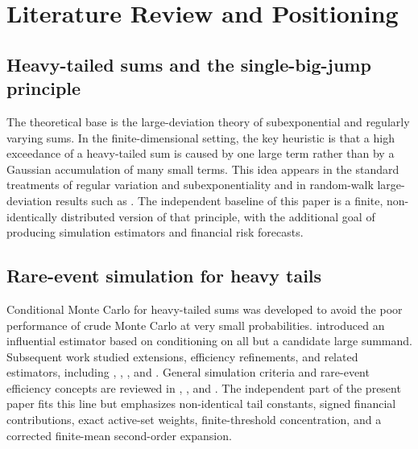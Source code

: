 \section{Literature Review and Positioning}
\label{sec:literature}

\subsection{Heavy-tailed sums and the single-big-jump principle}

The theoretical base is the large-deviation theory of subexponential and
regularly varying sums. In the finite-dimensional setting, the key heuristic is
that a high exceedance of a heavy-tailed sum is caused by one large term rather
than by a Gaussian accumulation of many small terms. This idea appears in the
standard treatments of regular variation and subexponentiality
\citep{BinghamGoldieTeugels1987,EmbrechtsKluppelbergMikosch1997,Resnick2007,FossKorshunovZachary2013}
and in random-walk large-deviation results such as
\citet{DenisovDiekerShneer2008}. The independent baseline of this paper is a
finite, non-identically distributed version of that principle, with the
additional goal of producing simulation estimators and financial risk forecasts.

\subsection{Rare-event simulation for heavy tails}

Conditional Monte Carlo for heavy-tailed sums was developed to avoid the poor
performance of crude Monte Carlo at very small probabilities.
\citet{AsmussenKroese2006} introduced an influential estimator based on
conditioning on all but a candidate large summand. Subsequent work studied
extensions, efficiency refinements, and related estimators, including
\citet{ChanKroese2011}, \citet{HartingerKortschak2009},
\citet{AsmussenKortschak2015}, and \citet{GhamamiRoss2012}. General simulation
criteria and rare-event efficiency concepts are reviewed in
\citet{AsmussenGlynn2007}, \citet{Glasserman2004}, and
\citet{JunejaShahabuddin2006}. The independent part of the present paper fits
this line but emphasizes non-identical tail constants, signed financial
contributions, exact active-set weights, finite-threshold concentration, and a
corrected finite-mean second-order expansion.

